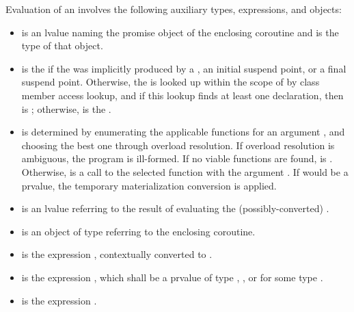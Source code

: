 \pnum
Evaluation of an  involves the following
auxiliary types, expressions, and objects:

\begin{itemize}
\item
{} is an lvalue naming the promise
object
of the enclosing coroutine and  is the type of that object.

\item {} is the  if
the  was implicitly produced by a
, an initial suspend point,
or a final suspend point.
Otherwise, the   is
looked up within the scope of  by class member access
lookup,
and if this lookup finds at least one declaration, then  is
\mbox{\tcode{)}};
otherwise,  is the  .

\item
{} is determined by enumerating the applicable
 functions for an argument
, and choosing the best one through
overload resolution. If overload resolution is ambiguous,
the program is ill-formed.
If no viable functions are found,  is .
Otherwise,  is a call to the selected function
with the argument .
If  would be a prvalue,
the temporary materialization conversion is applied.

\item
{} is an lvalue
referring to the result of evaluating
the (possibly-converted) .

\item
 is an object of type
referring to the enclosing coroutine.

\item
{} is the expression
,
contextually converted to .

\item
{} is the expression
\tcode{)},
which shall be a prvalue of type , , or
 for some type .

\item
{} is the expression
.
\end{itemize}


